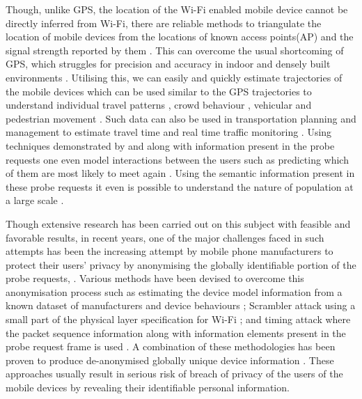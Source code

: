 Though, unlike GPS, the location of the Wi-Fi enabled mobile device cannot be
directly inferred from Wi-Fi, there are reliable methods to triangulate the
location of mobile devices from the locations of known access points(AP) and the
signal strength reported by them
\citep{he2003range,moore2004robust,lamarca2005place}. This can overcome the
usual shortcoming of GPS, which struggles for precision and accuracy in indoor
and densely built environments
\citep{zarim2006,kawaguchi2009wifi,xi2010locating}. Utilising this, we can
easily and quickly estimate trajectories of the mobile devices
\citep{Sorensenlocation,musa2012tracking} which can be used similar to the GPS
trajectories to understand individual travel patterns \citep{reki2007,Sap2015},
crowd behaviour \citep{abedi2013bluetooth,mowafi2013tracking}, vehicular
\citep{lu2010vehicle} and pedestrian movement
\citep{xu2013pedestrian,fukuzaki2014pedestrian,wang2016gait}. Such data can
also be used in transportation planning and management to estimate travel time
\citep{musa2011wiflow} and real time traffic monitoring
\citep{abbott2013empirical}. Using techniques demonstrated by
\cite{franklin2006passive} and \cite{pang2007802} along with information present
in the probe requests one even model interactions between the users
\citep{cheng2012inferring,barbera2013signals,cunche2014know,cunche2014linking}
such as predicting which of them are most likely to meet again
\citep{cunche2012know}. Using the semantic information present in these probe
requests it even is possible to understand the nature of population at a large
scale \citep{di2016mind}. 

Though extensive research has been carried out on this subject with feasible and
favorable results, in recent years, one of the major challenges faced in such
attempts has been the increasing attempt by mobile phone manufacturers to
protect their users’ privacy by anonymising the globally identifiable portion of
the probe requests, \citep{green2008}. Various methods have been devised to
overcome this anonymisation process such as estimating the device model
information from a known dataset of manufacturers and device behaviours
\citep{martin2016decomposition}; Scrambler attack using a small part of the
physical layer specification for Wi-Fi \citep{vo2016,bloessl2015scrambler}; and
timing attack where the packet sequence information along with information
elements present in the probe request frame is used
\citep{matte2016,cheng2016can}. A combination of these methodologies has been
proven to produce de-anonymised globally unique device information
\citep{vanhoef2016,martin2017}. These approaches usually result in serious risk
of breach of privacy of the users of the mobile devices by revealing their
identifiable personal information.

